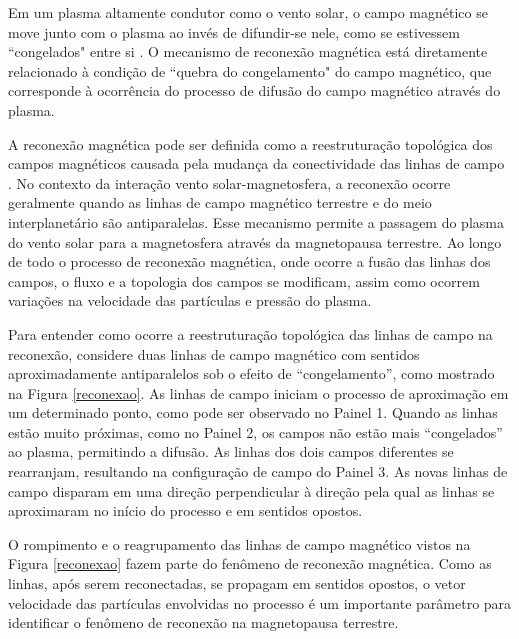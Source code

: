 Em um plasma altamente condutor como o vento solar, o campo magnético se move junto com o plasma ao invés de difundir-se nele, como se estivessem ``congelados" entre si \cite{souza2016,costa2011}. O mecanismo de reconexão magnética está diretamente relacionado à condição de ``quebra do congelamento" do campo magnético, que corresponde à ocorrência do processo de difusão do campo magnético através do plasma. 

A reconexão magnética pode ser definida como a reestruturação topológica dos campos magnéticos causada pela mudança da conectividade das linhas de campo \cite{baumjohann1996}. No contexto da interação vento solar-magnetosfera, a reconexão ocorre geralmente quando as linhas de campo magnético terrestre e do meio interplanetário são antiparalelas. Esse mecanismo permite a passagem do plasma do vento solar para a magnetosfera através da magnetopausa terrestre. Ao longo de todo o processo de reconexão magnética, onde ocorre a fusão das linhas dos campos, o fluxo e a topologia dos campos se modificam, assim como ocorrem variações na velocidade das partículas e pressão do plasma.   

Para entender como ocorre a reestruturação topológica das linhas de campo na reconexão, considere duas linhas de campo magnético com sentidos aproximadamente antiparalelos sob o efeito de ``congelamento'', como mostrado na Figura \ref{reconexao}. As linhas de campo iniciam o processo de aproximação em um determinado ponto, como pode ser observado no Painel 1. Quando as linhas estão muito próximas, como no Painel 2, os campos não estão mais ``congelados'' ao plasma, permitindo a difusão. As linhas dos  dois campos diferentes se rearranjam, resultando na configuração de campo do Painel 3. As novas linhas de campo disparam em uma direção perpendicular à direção pela qual as linhas se aproximaram no início do processo e em sentidos opostos. 

O rompimento e o reagrupamento das linhas de campo magnético vistos na Figura \ref{reconexao} fazem parte do fenômeno de reconexão magnética. Como as linhas, após serem reconectadas, se propagam em sentidos opostos, o vetor velocidade das partículas envolvidas no processo é um importante parâmetro para identificar o fenômeno de reconexão na magnetopausa terrestre.

